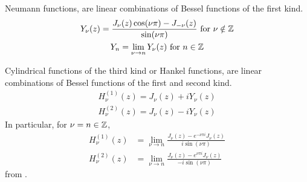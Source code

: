 %
  \begin{defn}\label{defn:neumann_func}
    Neumann functions, are linear combinations of Bessel functions of the first kind.
      \begin{gather*}
          Y_\nu (z) = \frac{J_\nu(z) \cos (\nu \pi) - J_{-\nu}(z)}{\sin (\nu \pi)} \text{ for } \nu \notin \mathbb{Z}\\
          Y_n = \lim_{\nu \rightarrow n} Y_\nu (z) \text{ for } n \in \mathbb{Z}
      \end{gather*}
  \end{defn}\par
  \begin{defn}\label{defn:hankel_func}
    Cylindrical functions of the third kind or Hankel functions, are linear combinations of Bessel functions of the first and second kind.
      \begin{align*}
          H^{(1)}_\nu(z) = J_\nu(z) + i Y_\nu(z)\\
          H^{(2)}_\nu(z) = J_\nu(z) - i Y_\nu(z)
      \end{align*}
    In particular, for $\nu = n \in \mathbb{Z}$,
      \begin{align*}
        H^{(1)}_\nu(z)
          &= \lim_{\nu \rightarrow n} \frac{J_{\nu}(z) - e^{-\nu\pi i} J_\nu(z)}{i \sin(\nu \pi)} \\
        H^{(2)}_\nu(z)
          &= \lim_{\nu \rightarrow n} \frac{J_{\nu}(z) - e^{\nu\pi i} J_\nu(z)}{- i \sin(\nu \pi)}
      \end{align*}
    from \cite{karmazina19cylinderfunc}.
  \end{defn}
